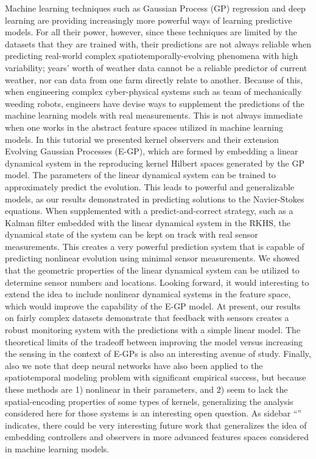\documentclass[letterpaper,12pt,peerreviewca,draftcls]{IEEEtran}
\begin{document}
Machine learning techniques such as Gaussian Process (GP) regression and deep learning are providing increasingly more powerful ways of learning predictive models. For all their power, however, since these techniques are limited by the datasets that they are trained with, their predictions are not always reliable when predicting real-world complex spatiotemporally-evolving phenomena with high variability; years' worth of weather data cannot be a reliable predictor of current weather, nor can data from one farm directly relate to another. Because of this, when engineering complex cyber-physical systems such as team of mechanically weeding robots, engineers have devise ways to supplement the predictions of the machine learning models with real measurements. This is not always immediate when one works in the abstract feature spaces utilized in machine learning models. In this tutorial we presented kernel observers and their extension Evolving Gaussian Processes (E-GP), which are formed by embedding a linear dynamical system in the reproducing kernel Hilbert spaces generated by the GP model. The parameters of the linear dynamical system can be trained to approximately predict the evolution. This leads to powerful and generalizable models, as our results demonstrated in predicting solutions to the Navier-Stokes equations. When supplemented with a predict-and-correct strategy, such as a Kalman filter embedded with the linear dynamical system in the RKHS, the dynamical state of the system can be kept on track with real sensor measurements. This creates a very powerful prediction system that is capable of predicting nonlinear evolution using minimal sensor measurements. We showed that the geometric properties of the linear dynamical system can be utilized to determine sensor numbers and locations. Looking forward, it would interesting to extend the idea to include nonlinear dynamical systems in the feature space, which would improve the capability of the E-GP model. At present, our results on fairly complex datasets demonstrate that feedback with sensors creates a robust monitoring system with the predictions with a simple linear model. The theoretical limits of the tradeoff between improving the model versus increasing the sensing in the context of E-GPs is also an interesting avenue of study. Finally, also we note that deep neural networks have also been applied to the spatiotemporal modeling problem with significant empirical success\cite{tran2015learning}, but because these methods are 1) nonlinear in their parameters, and 2) seem to lack the spatial-encoding properties of some types of kernels, generalizing the analysis considered here for those systems is an interesting open question. As sidebar ``'' indicates, there could be very interesting future work that generalizes the idea of embedding controllers and observers in more advanced features spaces considered in machine learning models. 
\end{document}
